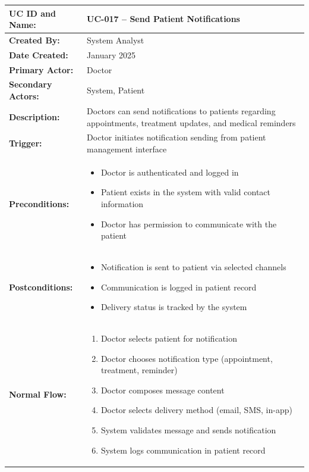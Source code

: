 \documentclass[12pt,a4paper]{article}
\begin{document}
\renewcommand{\arraystretch}{1.5}
\begin{longtable}{|p{4.5cm}|p{10.5cm}|}
\hline
\textbf{UC ID and Name:} & UC-017 – Send Patient Notifications \\
\hline
\textbf{Created By:} & System Analyst \\
\hline
\textbf{Date Created:} & January 2025 \\
\hline
\textbf{Primary Actor:} & Doctor \\
\hline
\textbf{Secondary Actors:} & System, Patient \\
\hline
\textbf{Description:} & Doctors can send notifications to patients regarding appointments, treatment updates, and medical reminders \\
\hline
\textbf{Trigger:} & Doctor initiates notification sending from patient management interface \\
\hline
\textbf{Preconditions:} &
\begin{itemize}
  \item Doctor is authenticated and logged in
  \item Patient exists in the system with valid contact information
  \item Doctor has permission to communicate with the patient
\end{itemize} \\
\hline
\textbf{Postconditions:} &
\begin{itemize}
  \item Notification is sent to patient via selected channels
  \item Communication is logged in patient record
  \item Delivery status is tracked by the system
\end{itemize} \\
\hline
\textbf{Normal Flow:} &
\begin{enumerate}
  \item Doctor selects patient for notification
  \item Doctor chooses notification type (appointment, treatment, reminder)
  \item Doctor composes message content
  \item Doctor selects delivery method (email, SMS, in-app)
  \item System validates message and sends notification
  \item System logs communication in patient record
\end{enumerate} \\

\end{longtable}
\end{document}
